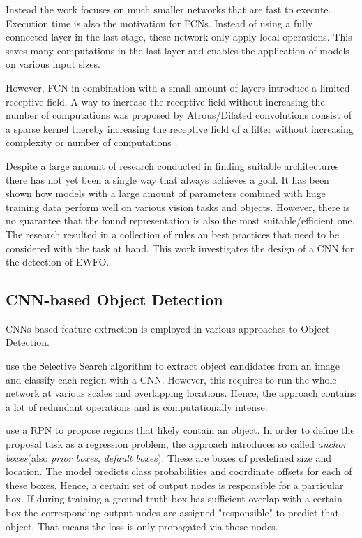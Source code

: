 	Instead the work focuses on much smaller networks that are fast to execute. Execution time is also the motivation for \acp{FCN}. Instead of using a fully connected layer in the last stage, these network only apply local operations. This saves many computations in the last layer and enables the application of models on various input sizes.
	
	However, \ac{FCN} in combination with a small amount of layers introduce a limited receptive field. A way to increase the receptive field without increasing the number of computations was proposed by Atrous/Dilated convolutions consist of a sparse kernel thereby increasing the receptive field of a filter without increasing complexity or number of computations .
	
	Despite a large amount of research conducted in finding suitable architectures there has not yet been a single way that always achieves a goal. It has been shown how models with a large amount of parameters combined with huge training data perform well on various vision tasks and objects. However, there is no guarantee that the found representation is also the most suitable/efficient one. The research resulted in a collection of rules an best practices that need to be considered with the task at hand. This work investigates the design of a \ac{CNN} for the detection of \ac{EWFO}.
	
	\subsection{\ac{CNN}-based Object Detection}
	
	\acp{CNN}-based feature extraction is employed in various approaches to Object Detection. 	

	\citeauthor{Girshick2013} \cite{Girshick2013} use the Selective Search algorithm \cite{Uijlings2013} to extract object candidates from an image and classify each region with a \ac{CNN}. However, this requires to run the whole network at various scales and overlapping locations. Hence, the approach contains a lot of redundant operations and is computationally intense.
	
	\citeauthor{Ren} \cite{Ren} use a \ac{RPN} to propose regions that likely contain an object. In order to define the proposal task as a regression problem, the approach introduces so called \textit{anchor boxes}(also \textit{prior boxes}, \textit{default boxes}). These are boxes of predefined size and location. The model predicts class probabilities and coordinate offsets for each of these boxes. Hence, a certain set of output nodes is responsible for a particular box. If during training a ground truth box has sufficient overlap with a certain box the corresponding output nodes are assigned "responsible" to predict that object. That means the loss is only propagated via those nodes. 
	
